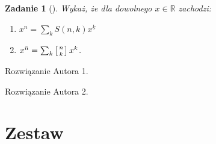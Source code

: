 \documentclass{mwart}
\newtheorem{zad}{Zadanie}[section]
\begin{document}
\begin{zad}[]
    Wykaż, że dla dowolnego $x \in \mathbb{R}$ zachodzi:
    \begin{enumerate}
        \item $x^n = \sum_{k}S(n,k) x^{\underline{k}}$
        \item $x^{\bar{n}} = \sum_{k} \left[n \atop k \right] x^k$.
    \end{enumerate}
\end{zad}
\begin{mdframed}
    Rozwiązanie Autora 1.
\end{mdframed}
\begin{mdframed}
    Rozwiązanie Autora 2.
\end{mdframed}






















































































\newpage
\section{Zestaw}          %
\end{document}

